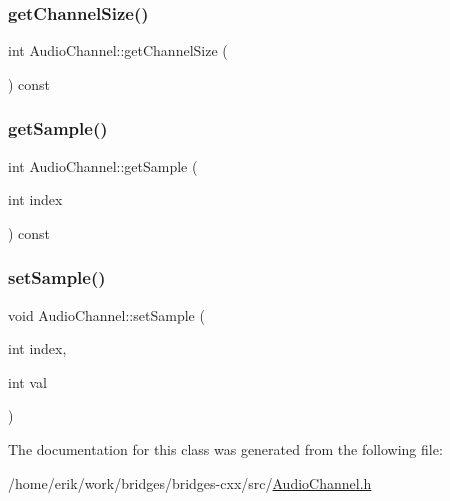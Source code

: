 \subsubsection{\texorpdfstring{get\+Channel\+Size()}{getChannelSize()}}
{\footnotesize\ttfamily int Audio\+Channel\+::get\+Channel\+Size (\begin{DoxyParamCaption}{ }\end{DoxyParamCaption}) const\hspace{0.3cm}{\ttfamily [inline]}}

\mbox{\label{class_audio_channel_a5030a4c2bcf41e1f13479de45bbf6d01}} 
\subsubsection{\texorpdfstring{get\+Sample()}{getSample()}}
{\footnotesize\ttfamily int Audio\+Channel\+::get\+Sample (\begin{DoxyParamCaption}\item[{int}]{index }\end{DoxyParamCaption}) const\hspace{0.3cm}{\ttfamily [inline]}}

\mbox{\label{class_audio_channel_a64bcb02bc7c731bc87d60c0ffabe7e99}} 
\subsubsection{\texorpdfstring{set\+Sample()}{setSample()}}
{\footnotesize\ttfamily void Audio\+Channel\+::set\+Sample (\begin{DoxyParamCaption}\item[{int}]{index,  }\item[{int}]{val }\end{DoxyParamCaption})\hspace{0.3cm}{\ttfamily [inline]}}



The documentation for this class was generated from the following file\+:\begin{DoxyCompactItemize}
\item 
/home/erik/work/bridges/bridges-\/cxx/src/\hyperlink{_audio_channel_8h}{Audio\+Channel.\+h}\end{DoxyCompactItemize}
